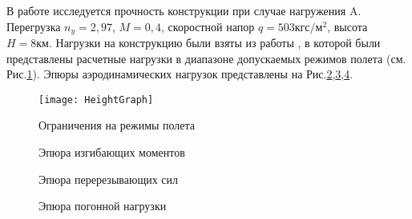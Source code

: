 В работе исследуется прочность конструкции при случае нагружения A. Перегрузка $n_y = 2,97$, $M = 0,4$, скоростной напор $q = 503 \text{кгс}/\text{м}^2$, высота $H = 8\text{км}$. Нагрузки на конструкцию были взяты из работы \cite{BPS}, в которой были представлены расчетные нагрузки в диапазоне допускаемых режимов полета (см. Рис.\ref{fig:ModeOfFlight}). 
Эпюры аэродинамических нагрузок представлены на Рис.\ref{fig:BendingMoments},\ref{fig:CuttingForces},\ref{fig:DistributedLoad}.



\begin{figure}[H]
\centering
\texttt{[image: HeightGraph]}
\caption{Ограничения на режимы полета}
\label{fig:ModeOfFlight}
\end{figure}


\begin{figure}[H]
\centering
\def\svgwidth{0.7\textwidth}

\caption{Эпюра изгибающих моментов}
\label{fig:BendingMoments}
\end{figure}

\begin{figure}[H]
\centering
\def\svgwidth{0.7\textwidth}

\caption{Эпюра перерезывающих сил}
\label{fig:CuttingForces}
\end{figure}

\begin{figure}[H]
\centering
\def\svgwidth{0.7\textwidth}

\caption{Эпюра погонной нагрузки}
\label{fig:DistributedLoad}
\end{figure}


